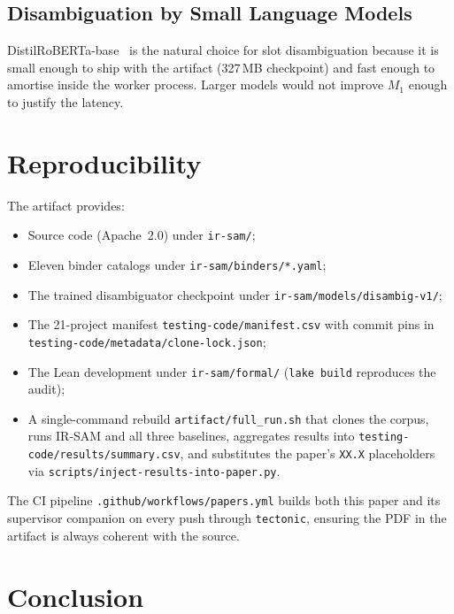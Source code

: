 \documentclass[conference]{IEEEtran}
\newcommand{\IRSAM}{\textsc{IR-SAM}}
\begin{document}
\subsection{Disambiguation by Small Language Models}
DistilRoBERTa-base~\cite{huggingface_distilroberta_2020,
sutton_distilbert_2020} is the natural choice for slot disambiguation
because it is small enough to ship with the artifact (327\,MB
checkpoint) and fast enough to amortise inside the worker
process. Larger models would not improve $M_1$ enough to justify
the latency.

\section{Reproducibility}\label{sec:repro}

The artifact provides:
\begin{itemize}[leftmargin=*]
\item Source code (Apache~2.0) under \texttt{ir-sam/};
\item Eleven binder catalogs under \texttt{ir-sam/binders/*.yaml};
\item The trained disambiguator checkpoint under
      \texttt{ir-sam/models/disambig-v1/};
\item The 21-project manifest \texttt{testing-code/manifest.csv} with
      commit pins in \texttt{testing-code/metadata/clone-lock.json};
\item The Lean development under \texttt{ir-sam/formal/}
      (\texttt{lake build} reproduces the audit);
\item A single-command rebuild
      \texttt{artifact/full\_run.sh} that clones the corpus, runs
      \IRSAM{} and all three baselines, aggregates results into
      \texttt{testing-code/results/summary.csv}, and substitutes the
      paper's \texttt{XX.X} placeholders via
      \texttt{scripts/inject-results-into-paper.py}.
\end{itemize}
\noindent The CI pipeline \texttt{.github/workflows/papers.yml}
builds both this paper and its supervisor companion on every push
through \texttt{tectonic}, ensuring the PDF in the artifact is
always coherent with the source.

\section{Conclusion}\label{sec:conclusion}
\end{document}
